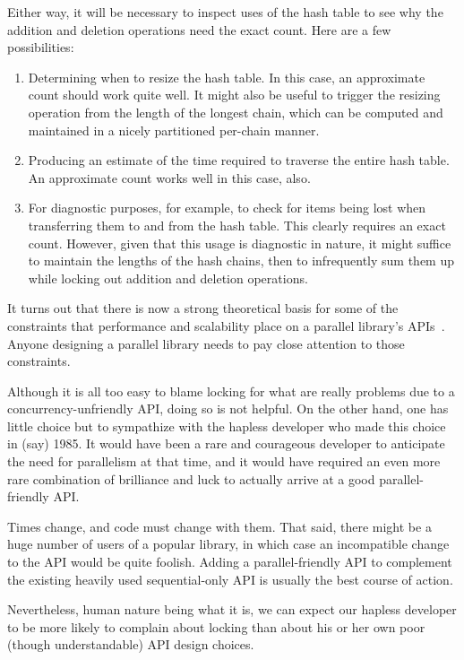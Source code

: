 Either way, it will be necessary to inspect uses of the hash table to see
why the addition and deletion operations need the exact count.
Here are a few possibilities:

\begin{enumerate}
\item	Determining when to resize the hash table.
	In this case, an approximate count should work quite well.
	It might also be useful to trigger the resizing operation from
	the length of the longest chain, which can be computed and
	maintained in a nicely partitioned per-chain manner.
\item	Producing an estimate of the time required to traverse the
	entire hash table.
	An approximate count works well in this case, also.
\item	For diagnostic purposes, for example, to check for items being
	lost when transferring them to and from the hash table.
	This clearly requires an exact count.
	However, given that this usage is diagnostic in nature, it might
	suffice to maintain the lengths of the hash chains, then to
	infrequently sum them
	up while locking out addition and deletion operations.
\end{enumerate}

It turns out that there is now a strong theoretical basis for some of the
constraints that performance and scalability place on a parallel library's
APIs~\cite{HagitAttiya2011LawsOfOrder,Attiya:2011:LOE:1925844.1926442,PaulEMcKenney2011SNC}.
Anyone designing a parallel library needs to pay close attention to
those constraints.

Although it is all too easy to blame locking for what are really problems
due to a concurrency-unfriendly API, doing so is not helpful.
On the other hand, one has little choice but to sympathize with the
hapless developer who made this choice in (say) 1985.
It would have been a rare and courageous developer to anticipate the
need for parallelism at that time, and it would have required an
even more rare combination of brilliance and luck to actually arrive
at a good parallel-friendly API\@.

Times change, and code must change with them.
That said, there might be a huge number of users of a popular library,
in which case an incompatible change to the API would be quite foolish.
Adding a parallel-friendly API to complement the existing heavily used
sequential-only API is usually the best course of action.

Nevertheless, human nature being what it is, we can expect our hapless
developer to be more likely to complain about locking than about his
or her own poor (though understandable) API design choices.

